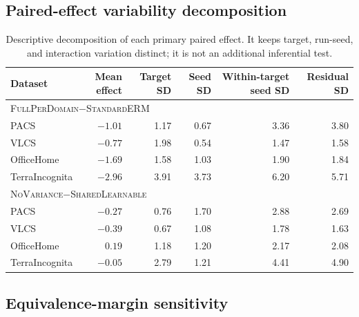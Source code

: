 \documentclass[10pt]{article}
\newcommand{\full}{\textsc{FullPerDomain}}
\newcommand{\erm}{\textsc{StandardERM}}
\newcommand{\shared}{\textsc{SharedLearnable}}
\newcommand{\novar}{\textsc{NoVariance}}
\begin{document}
\begin{table}[H]
\centering
\caption{Mean paired effects after averaging the four paired run-seed
differences within target. Run-seed-pair SD is descriptive.}
\label{tab:target-effects}
\scriptsize
\resizebox{\textwidth}{!}{%
}
\end{table}

\subsection{Paired-effect variability decomposition}

\begin{table}[H]
\centering
\caption{Descriptive decomposition of each primary paired effect. It keeps
target, run-seed, and interaction variation distinct; it is not an additional
inferential test.}
\label{tab:effect-variability}
\small
\setlength{\tabcolsep}{4pt}
\begin{tabular}{lrrrrr}
\toprule
Dataset & Mean effect & Target SD & Seed SD & Within-target seed SD & Residual SD \\
\midrule
\multicolumn{6}{l}{\full{}$-$\erm{}} \\
PACS & $-1.01$ & 1.17 & 0.67 & 3.36 & 3.80 \\
VLCS & $-0.77$ & 1.98 & 0.54 & 1.47 & 1.58 \\
OfficeHome & $-1.69$ & 1.58 & 1.03 & 1.90 & 1.84 \\
TerraIncognita & $-2.96$ & 3.91 & 3.73 & 6.20 & 5.71 \\
\midrule
\multicolumn{6}{l}{\novar{}$-$\shared{}} \\
PACS & $-0.27$ & 0.76 & 1.70 & 2.88 & 2.69 \\
VLCS & $-0.39$ & 0.67 & 1.08 & 1.78 & 1.63 \\
OfficeHome & $0.19$ & 1.18 & 1.20 & 2.17 & 2.08 \\
TerraIncognita & $-0.05$ & 2.79 & 1.21 & 4.41 & 4.90 \\
\bottomrule
\end{tabular}
\end{table}

\subsection{Equivalence-margin sensitivity}
\end{document}

